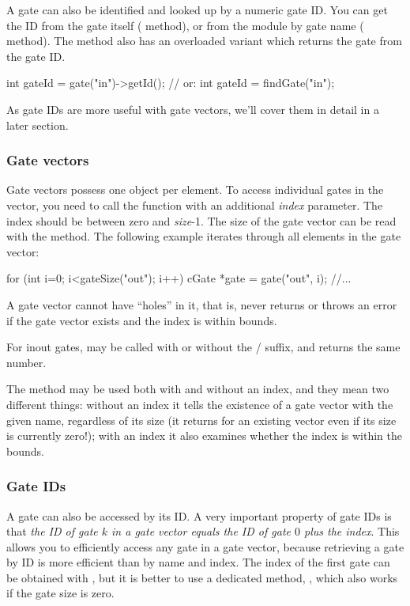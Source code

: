 A gate can also be identified and looked up by a numeric gate ID.
You can get the ID from the gate itself ( method),
or from the module by gate name ( method).
The  method also has an overloaded variant which
returns the gate from the gate ID.

\begin{cpp}
int gateId = gate("in")->getId();  // or:
int gateId = findGate("in");
\end{cpp}

As gate IDs are more useful with gate vectors, we'll cover them
in detail in a later section.


\subsubsection{Gate vectors}

Gate vectors possess one  object per element.
To access individual gates in the vector, you need to call
the  function with an additional \textit{index}
parameter. The index should be between zero and \textit{size}-1.
The size of the gate vector can be read with the 
method. The following example iterates through all elements in the
gate vector:

\begin{cpp}
for (int i=0; i<gateSize("out"); i++) {
    cGate *gate = gate("out", i);
    //...
}
\end{cpp}

A gate vector cannot have ``holes'' in it, that is, 
never returns  or throws an error if the gate vector exists
and the index is within bounds.

For inout gates,  may be called with or without
the / suffix, and returns the same number.

The  method may be used both with and without an
index, and they mean two different things: without an index it tells
the existence of a gate vector with the given name, regardless of its
size (it returns  for an existing vector even if its size
is currently zero!); with an index it also examines whether the index
is within the bounds.


\subsubsection{Gate IDs}

A gate can also be accessed by its ID. A very important property of gate IDs
is that \textit{the ID of gate $k$ in a gate vector equals the ID of gate $0$ plus the index}.
This allows you to efficiently access any gate in a gate vector, because
retrieving a gate by ID is more efficient than by name and index.
The index of the first gate can be obtained with ,
but it is better to use a dedicated method, ,
which also works if the gate size is zero.

